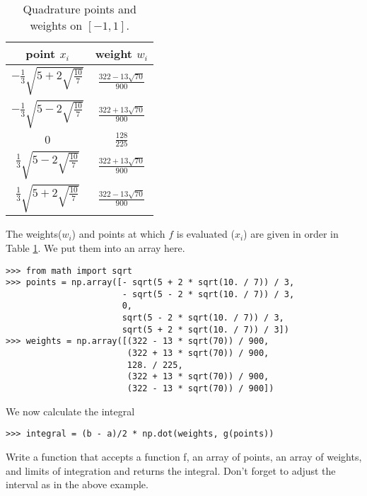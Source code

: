 \begin{table}[h!]
\begin{center}
\begin{tabular}{|c|c|}
\hline
point $x_i$ & weight $w_i$ \\
\hline
$-\frac{1}{3}\sqrt{5 + 2\sqrt{\frac{10}{7}}}$ &  $\frac{322-13\sqrt{70}}{900}$ \\
\hline
$-\frac{1}{3}\sqrt{5 - 2\sqrt{\frac{10}{7}}}$ & $\frac{322+13\sqrt{70}}{900}$ \\
\hline
$0$ & $\frac{128}{225}$ \\
\hline
$\frac{1}{3}\sqrt{5 - 2\sqrt{\frac{10}{7}}}$ & $\frac{322+13\sqrt{70}}{900}$ \\
\hline
$\frac{1}{3}\sqrt{5 + 2\sqrt{\frac{10}{7}}}$ & $\frac{322-13\sqrt{70}}{900}$ \\
\hline
\end{tabular}
\end{center}
\caption{Quadrature points and weights on $\left[-1, 1\right]$.}
\label{intro_table}
\end{table}

The weights($w_i$) and points at which $f$ is evaluated ($x_i$) are given in order in Table \ref{intro_table}.
We put them into an array here.

\begin{lstlisting}
>>> from math import sqrt
>>> points = np.array([- sqrt(5 + 2 * sqrt(10. / 7)) / 3,
                       - sqrt(5 - 2 * sqrt(10. / 7)) / 3,
                       0,
                       sqrt(5 - 2 * sqrt(10. / 7)) / 3,
                       sqrt(5 + 2 * sqrt(10. / 7)) / 3])
>>> weights = np.array([(322 - 13 * sqrt(70)) / 900,
                        (322 + 13 * sqrt(70)) / 900,
                        128. / 225,
                        (322 + 13 * sqrt(70)) / 900,
                        (322 - 13 * sqrt(70)) / 900])
\end{lstlisting}

We now calculate the integral

\begin{lstlisting}
>>> integral = (b - a)/2 * np.dot(weights, g(points))
\end{lstlisting}

\begin{problem} %
Write a function that accepts a function f, an array of points, an array of weights, and limits of integration and returns the integral.
Don't forget to adjust the interval as in the above example.
\end{problem}

